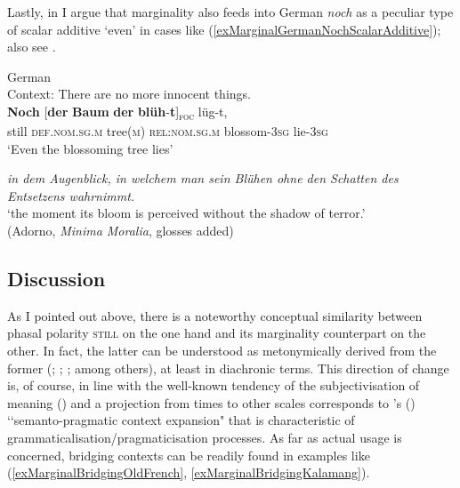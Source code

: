 Lastly, in \textcite{PersohnSchonNoch} I argue that marginality also feeds into German \textit{noch} as a peculiar type of scalar additive \lq even\rq{ }in cases like (\ref{exMarginalGermanNochScalarAdditive}); also see .

\begin{exe}
	\ex German\label{exMarginalGermanNochScalarAdditive}\\
	Context: There are no more innocent things.\\
	\gll \textbf{Noch} \textup{[}\textbf{der} \textbf{Baum} \textbf{der} \textbf{blüh}-\textbf{t}\textup{]\textsubscript{\textsc{foc}}} lüg-t,\\
	still \phantom{[}\textsc{def}.\textsc{nom}.\textsc{sg}.\textsc{m} tree(\textsc{m}) \textsc{rel}:\textsc{nom}.\textsc{sg}.\textsc{m} blossom-3\textsc{sg} lie-3\textsc{sg}\\
	\glt \lq Even the blossoming tree lies\rq{}

	\sn 
\textit{in dem Augenblick, in welchem man sein Blühen ohne den Schatten des Entsetzens wahrnimmt.}\\	
	\lq the moment its bloom is perceived without the shadow of terror.'
	\\(Adorno, \textit{Minima Moralia}, glosses added)
\end{exe}

\subsection[tocentry={}]{Discussion} 
As I pointed out above, there is a noteworthy conceptual similarity between phasal polarity \textsc{still} on the one hand and its marginality counterpart on the other. In fact, the latter can be understood as metonymically derived from the former (\cite{MosegaardHansen2008}; \cite{Krifka2000}; \cite{Loebner1989}; among others), at least in diachronic terms. This direction of change is, of course, in line with the well-known tendency of the subjectivisation of meaning () and a projection from times to other scales corresponds to \citeauthor{Himmelmann2004}'s (\citeyear{Himmelmann2004}) \lq\lq semanto-pragmatic context expansion" that is characteristic of grammaticalisation/pragmaticisation processes. As far as actual usage is concerned, bridging contexts can be readily found in examples like (\ref{exMarginalBridgingOldFrench}, \ref{exMarginalBridgingKalamang}).

